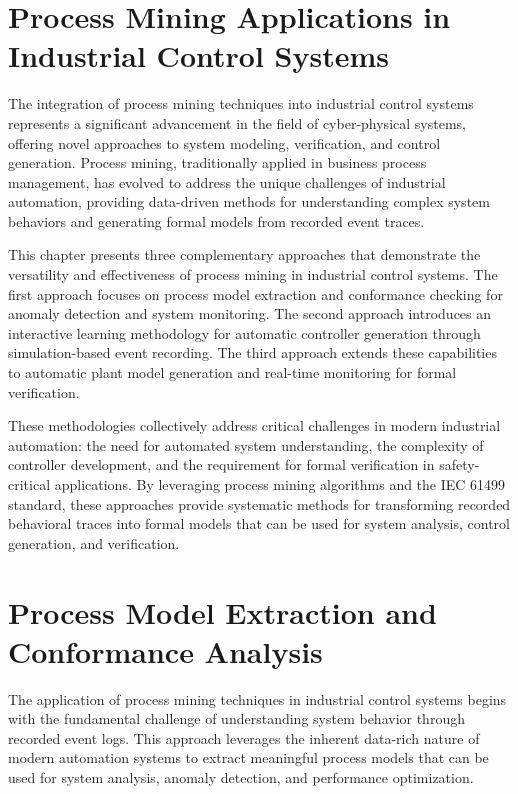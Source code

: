 \section{Process Mining Applications in Industrial Control Systems}

The integration of process mining techniques into industrial control systems represents a significant advancement in the field of cyber-physical systems, offering novel approaches to system modeling, verification, and control generation. Process mining, traditionally applied in business process management, has evolved to address the unique challenges of industrial automation, providing data-driven methods for understanding complex system behaviors and generating formal models from recorded event traces.

This chapter presents three complementary approaches that demonstrate the versatility and effectiveness of process mining in industrial control systems. The first approach focuses on process model extraction and conformance checking for anomaly detection and system monitoring. The second approach introduces an interactive learning methodology for automatic controller generation through simulation-based event recording. The third approach extends these capabilities to automatic plant model generation and real-time monitoring for formal verification.

These methodologies collectively address critical challenges in modern industrial automation: the need for automated system understanding, the complexity of controller development, and the requirement for formal verification in safety-critical applications. By leveraging process mining algorithms and the IEC 61499 standard, these approaches provide systematic methods for transforming recorded behavioral traces into formal models that can be used for system analysis, control generation, and verification.

\section{Process Model Extraction and Conformance Analysis}

The application of process mining techniques in industrial control systems begins with the fundamental challenge of understanding system behavior through recorded event logs. This approach leverages the inherent data-rich nature of modern automation systems to extract meaningful process models that can be used for system analysis, anomaly detection, and performance optimization.

